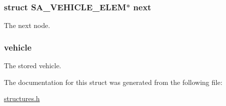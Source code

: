 \subsubsection[{\texorpdfstring{next}{next}}]{\setlength{\rightskip}{0pt plus 5cm}struct {\bf S\+A\+\_\+\+V\+E\+H\+I\+C\+L\+E\+\_\+\+E\+L\+EM}$\ast$ next}\hypertarget{struct_s_a___v_e_h_i_c_l_e___e_l_e_m_a3453ed6d13776f9cdac63f6047c663ab}{}\label{struct_s_a___v_e_h_i_c_l_e___e_l_e_m_a3453ed6d13776f9cdac63f6047c663ab}


The next node. 

\subsubsection[{\texorpdfstring{vehicle}{vehicle}}]{ vehicle}\hypertarget{struct_s_a___v_e_h_i_c_l_e___e_l_e_m_a8b1c58d0b6341be5c62063c40fdd5bf2}{}\label{struct_s_a___v_e_h_i_c_l_e___e_l_e_m_a8b1c58d0b6341be5c62063c40fdd5bf2}


The stored vehicle. 



The documentation for this struct was generated from the following file\+:\begin{DoxyCompactItemize}
\item 
\hyperlink{structures_8h}{structures.\+h}\end{DoxyCompactItemize}
